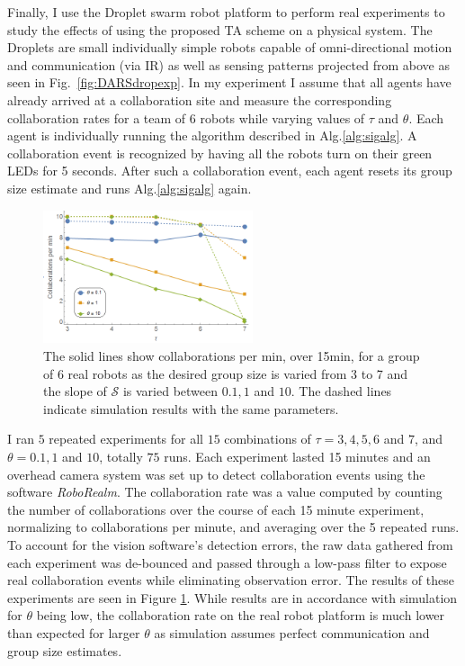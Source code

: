 \documentclass[12pt]{book}
\newcommand{\Sig}{\mathcal{S}}  %
\begin{document}
Finally, I use the Droplet swarm robot platform to perform real experiments to study the effects of using the proposed TA scheme on a physical system. The Droplets are small individually simple robots capable of omni-directional motion and communication (via IR) as well as sensing patterns projected from above as seen in Fig.~\ref{fig:DARSdropexp}. In my experiment I assume that all agents have already arrived at a collaboration site and measure the corresponding collaboration rates for a team of 6 robots while varying values of $\tau$ and $\theta$. Each agent is individually running the algorithm described in Alg.\ref{alg:sigalg}. A collaboration event is recognized by having all the robots turn on their green LEDs for 5 seconds. After such a collaboration event, each agent resets its group size estimate and runs Alg.\ref{alg:sigalg} again. 

\begin{figure}[!htb]
\centering\includegraphics[width=0.55\textwidth]{../assets/realsimexpnew.png}
\caption{The solid lines show collaborations per min, over 15min, for a group of 6 real robots as the desired group size is varied from 3 to 7 and the slope of $\Sig$ is varied between $0.1, 1$ and $10$. The dashed lines indicate simulation results with the same parameters.\label{fig:expdat} }
\end{figure}

I ran $5$ repeated experiments for all $15$ combinations of $\tau = 3,4,5,6$ and $7$, and $\theta = 0.1, 1$ and $10$, totally $75$ runs. Each experiment lasted 15 minutes and an overhead camera system was set up to detect collaboration events using the software \emph{RoboRealm}. The collaboration rate was a value computed by counting the number of collaborations over the course of each 15 minute experiment, normalizing to collaborations per minute, and averaging over the 5 repeated runs. 
To account for the vision software's detection errors, the raw data gathered from each experiment was de-bounced and passed through a low-pass filter to expose real collaboration events while eliminating observation error. The results of these experiments are seen in Figure \ref{fig:expdat}. While results are in accordance with simulation for $\theta$ being low, the collaboration rate on the real robot platform is much lower than expected for larger $\theta$ as simulation assumes perfect communication and group size estimates.
\end{document}
